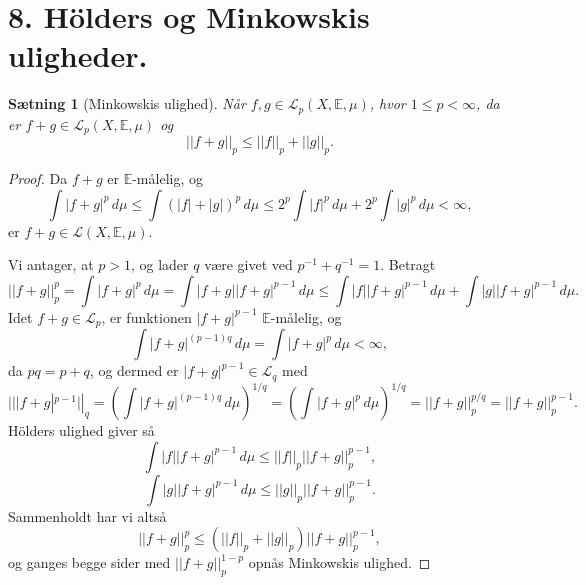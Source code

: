 \documentclass[12pt]{report}
\newtheorem{theorem}[lemma]{Sætning}
\theoremstyle{break}
\newtheorem*{proof}{Bevis}
\theoremstyle{break}
\newcommand{\Int}[1]{\int#1\,d\mu}
\newcommand{\EE}{\mathbb{E}}
\renewcommand{\L}{\mathcal{L}}
\newcommand{\laengde}[1]{\lvert|#1\rvert|}
\newcommand{\1}{\mathds{1}}
\begin{document}
\newpage
\section*{8. Hölders og Minkowskis uligheder.}
\begin{theorem}[Minkowskis ulighed]
Når $f,g\in\L_p(X,\EE,\mu)$, hvor $1\leq p<\infty$, da er $f+g\in\L_p(X,\EE,\mu)$ og \[\laengde{f+g}_p\leq\laengde{f}_p+\laengde{g}_p.\]
\end{theorem}
\begin{proof}
Da $f+g$ er $\EE$-målelig, og 
\[\Int{|f+g|^p}\leq\Int{(|f|+|g|)^p}\leq 2^p\Int{|f|^p}+2^p\Int{|g|^p}<\infty,\]
er $f+g\in\L(X,\EE,\mu)$.

\bigskip

Vi antager, at $p>1$, og lader $q$ være givet ved $p^{-1}+q^{-1}=1$. Betragt
\[\laengde{f+g}_p^p=\Int{|f+g|^p}=\Int{|f+g||f+g|^{p-1}}\leq\Int{|f||f+g|^{p-1}}+\Int{|g||f+g|^{p-1}}.\]
Idet $f+g\in\L_p$, er funktionen $|f+g|^{p-1}$  $\EE$-målelig, og 
\[\Int{|f+g|^{(p-1)q}}=\Int{|f+g|^p}<\infty,\]
da $pq = p+q$, og dermed er $|f+g|^{p-1}\in\L_q$ med
\[\laengde{|f+g|^{p-1}}_q=\left(\Int{|f+g|^{(p-1)q}}\right)^{1/q}=\left(\Int{|f+g|^p}\right)^{1/q} = \laengde{f+g}_p^{p/q}=\laengde{f+g}_p^{p-1}.\]
Hölders ulighed giver så
\[\Int{|f||f+g|^{p-1}}\leq\laengde{f}_p\laengde{f+g}_p^{p-1},\]
\[\Int{|g||f+g|^{p-1}}\leq\laengde{g}_p\laengde{f+g}_p^{p-1}.\]
Sammenholdt har vi altså
\[\laengde{f+g}_p^p\leq(\laengde{f}_p+\laengde{g}_p)\laengde{f+g}_p^{p-1},\]
og ganges begge sider med $\laengde{f+g}^{1-p}_p$ opnås Minkowskis ulighed.
\end{proof}


\newpage
\end{document}
